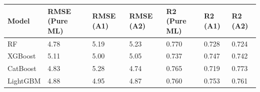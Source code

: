 \begin{tabular}{lllllll}
\toprule
Model & RMSE (Pure ML) & RMSE (A1) & RMSE (A2) & R2 (Pure ML) & R2 (A1) & R2 (A2) \\
\midrule
RF & 4.78 & 5.19 & 5.23 & 0.770 & 0.728 & 0.724 \\
XGBoost & 5.11 & 5.00 & 5.05 & 0.737 & 0.747 & 0.742 \\
CatBoost & 4.83 & 5.28 & 4.74 & 0.765 & 0.719 & 0.773 \\
LightGBM & 4.88 & 4.95 & 4.87 & 0.760 & 0.753 & 0.761 \\
\bottomrule
\end{tabular}
